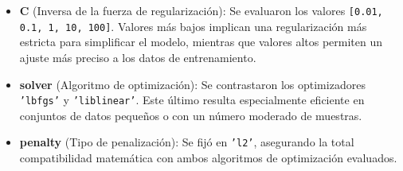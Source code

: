\begin{itemize}
    \item \textbf{C} (Inversa de la fuerza de regularización): Se evaluaron los valores \texttt{[0.01, 0.1, 1, 10, 100]}. Valores más bajos implican una regularización más estricta para simplificar el modelo, mientras que valores altos permiten un ajuste más preciso a los datos de entrenamiento.
    \item \textbf{solver} (Algoritmo de optimización): Se contrastaron los optimizadores \texttt{'lbfgs'} y \texttt{'liblinear'}. Este último resulta especialmente eficiente en conjuntos de datos pequeños o con un número moderado de muestras.
    \item \textbf{penalty} (Tipo de penalización): Se fijó en \texttt{'l2'}, asegurando la total compatibilidad matemática con ambos algoritmos de optimización evaluados.
\end{itemize}